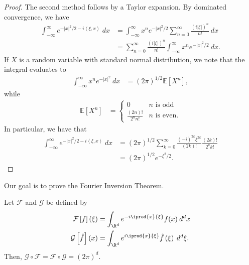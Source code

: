 \documentclass[10pt]{mypackage}
\begin{document}
\begin{proof}
  The second method follows by a Taylor expansion. By dominated convergence, we have
  \begin{align*}
    \int_{-\infty}^{\infty} e^{-\left\vert x \right\vert^2/2 - i\left\langle \xi, x \right\rangle}\:dx &= \int_{-\infty}^{\infty} x^{n}e^{-\left\vert x \right\vert^2/2}\sum_{n=0}^{\infty} \frac{\left( i\left\vert \xi \right\vert \right)^{n}}{n!}\:dx\\
                                                    &= \sum_{n=0}^{\infty} \frac{\left( i\left\vert \xi \right\vert \right)^{n}}{n!} \int_{-\infty}^{\infty} x^{n}e^{-\left\vert x \right\vert^2/2}\:dx.
  \end{align*}
  If $X$ is a random variable with standard normal distribution, we note that the integral evaluates to
  \begin{align*}
    \int_{-\infty}^{\infty} x^{n}e^{-\left\vert x \right\vert^2}\:dx &= \left( 2\pi \right)^{1/2} \mathbb{E}\left[ X^{n} \right],
  \end{align*}
  while
  \begin{align*}
    \mathbb{E}\left[ X^{n} \right] &= \begin{cases}
      0 & \text{$n$ is odd}\\
      \frac{\left( 2n \right)!}{2^{n}n!} & \text{$n$ is even}.
    \end{cases}
  \end{align*}
  In particular, we have that
  \begin{align*}
    \int_{-\infty}^{\infty} e^{-\left\vert x \right\vert^2/2-i\left\langle \xi,x \right\rangle}\:dx &= \left( 2\pi \right)^{1/2}\sum_{k=0}^{\infty} \frac{\left( -i \right)^{2k}\xi^{2k}}{\left( 2k \right)!} \frac{\left( 2k \right)!}{2^{k}k!}\\
                                                  &= \left( 2\pi \right)^{1/2} e^{-\xi^2/2}.
  \end{align*}
\end{proof}
Our goal is to prove the Fourier Inversion Theorem.
\begin{theorem}
  Let $\mathcal{F}$ and $ \mathcal{G} $ be defined by 
  \begin{align*}
    \mathcal{F}\left[ f \right](\xi) &= \int_{\R^d}^{} e^{-i \iprod{x}{\xi}}f(x)\:d^{d}x\\
    \mathcal{G}\left[ \hat{f} \right]\left( x \right) &= \int_{\R^{d}}^{} e^{i \iprod{x}{\xi}}\hat{f}\left( \xi \right)\:d^{d}\xi.
  \end{align*}
  Then, $ \mathcal{G}\circ \mathcal{F} = \mathcal{F}\circ \mathcal{G} = \left( 2\pi \right)^{d} $.
\end{theorem}
\end{document}
